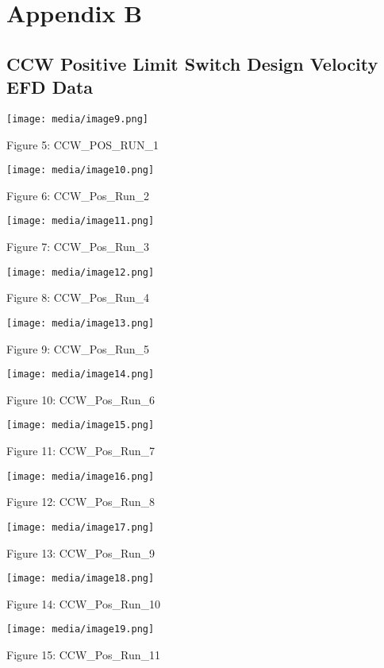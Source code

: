 \documentclass[SE,lsstdraft,authoryear,toc]{lsstdoc}
\begin{document}
\hypertarget{appendix-b}{%
\section{\texorpdfstring{Appendix B }{Appendix B }}\label{appendix-b}}

\hypertarget{ccw-positive-limit-switch-design-velocity-efd-data}{%
\subsection{CCW Positive Limit Switch Design Velocity EFD
Data}\label{ccw-positive-limit-switch-design-velocity-efd-data}}

\texttt{[image: media/image9.png]}

Figure 5: CCW\_POS\_RUN\_1

\texttt{[image: media/image10.png]}

Figure 6: CCW\_Pos\_Run\_2

\texttt{[image: media/image11.png]}

Figure 7: CCW\_Pos\_Run\_3

\texttt{[image: media/image12.png]}

Figure 8: CCW\_Pos\_Run\_4

\texttt{[image: media/image13.png]}

Figure 9: CCW\_Pos\_Run\_5

\texttt{[image: media/image14.png]}

Figure 10: CCW\_Pos\_Run\_6

\texttt{[image: media/image15.png]}

Figure 11: CCW\_Pos\_Run\_7

\texttt{[image: media/image16.png]}

Figure 12: CCW\_Pos\_Run\_8

\texttt{[image: media/image17.png]}

Figure 13: CCW\_Pos\_Run\_9

\texttt{[image: media/image18.png]}

Figure 14: CCW\_Pos\_Run\_10

\texttt{[image: media/image19.png]}

Figure 15: CCW\_Pos\_Run\_11
\end{document}
